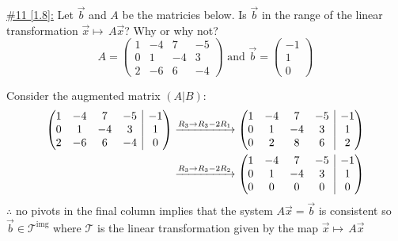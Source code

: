 \documentclass{exam}
\makeatletter
\newenvironment{amatrix}[1]{%
  \left(\begin{array}{@{}*{#1}{c}|c@{}}
}{%
  \end{array}\right)
}
\makeatother
\begin{document}
\underline{\#11 [1.8]:} Let $\vec{b}$ and $A$ be the matricies below. Is $\vec{b}$ in the range of the linear transformation $\vec{x}\mapsto\,A\vec{x}$? Why or why not?
\[
    A = \begin{pmatrix}
        1 & -4 & 7 & -5 \\
        0 & 1 & -4 & 3 \\
        2 & -6 & 6 & -4
    \end{pmatrix}
    \text{ and }
    \vec{b} = \begin{pmatrix}
        -1 \\ 1 \\ 0
    \end{pmatrix}
\]
\begin{solution}
    Consider the augmented matrix $(A | B)$:
    \begin{align*}
        \begin{amatrix}{4}
        1 & -4 & 7 & -5 & -1 \\
        0 & 1 & -4 & 3 & 1 \\
        2 & -6 & 6 & -4 & 0
        \end{amatrix}
        &\xrightarrow{R_3 \to R_3 - 2R_1}
        \begin{amatrix}{4}
        1 & -4 & 7 & -5 & -1 \\
        0 & 1 & -4 & 3 & 1 \\
        0 & 2 & 8 & 6 & 2
        \end{amatrix}\\
        &\xrightarrow{R_3 \to R_3 - 2R_2}
        \begin{amatrix}{4}
        1 & -4 & 7 & -5 & -1 \\
        0 & 1 & -4 & 3 & 1 \\
        0 & 0 & 0 & 0 & 0
        \end{amatrix}
    \end{align*}
    $\therefore$ no pivots in the final column implies that the system $A\vec{x}=\vec{b}$ is consistent so $\vec{b} \in \mathcal{T}^{\text{img}}$ where $\mathcal{T}$ is the linear transformation given by the map $\vec{x}\mapsto\,A\vec{x}$
\end{solution}
\end{document}
